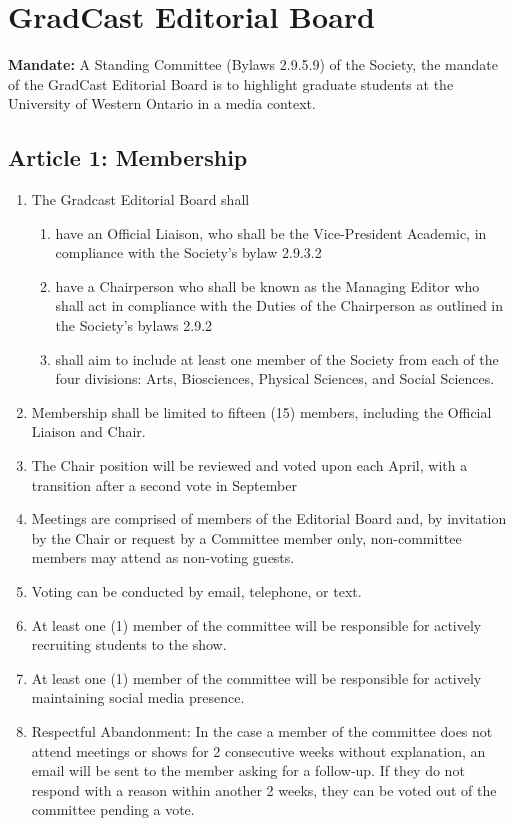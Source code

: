 \section{GradCast Editorial Board}

\textbf{Mandate:} A Standing Committee (Bylaws 2.9.5.9) of the Society, the mandate of the GradCast Editorial Board is to highlight graduate students at the University of Western Ontario in a media context.

\subsection{Article 1: Membership} 
\begin{enumerate} [label*=\arabic*., align=left]	
\item The Gradcast Editorial Board shall 

\begin{enumerate}[label*=\arabic*., align=left]	
\item have an Official Liaison, who shall be the Vice-President Academic, in compliance with the Society's bylaw 2.9.3.2 
\item have a Chairperson who shall be known as the Managing Editor who shall act in compliance with the Duties of the Chairperson as outlined in the Society's bylaws 2.9.2
\item  shall aim to include at least one member of the Society from each of the four divisions: Arts, Biosciences, Physical Sciences, and Social Sciences.
\end{enumerate}

\item Membership shall be limited to fifteen (15) members, including the Official Liaison and Chair.
\item The Chair position will be reviewed and voted upon each April, with a transition after a second vote in September
\item Meetings are comprised of members of the Editorial Board and, by invitation by the Chair or request by a Committee member only, non-committee members may attend as non-voting guests.
\item Voting can be conducted by email, telephone, or text.
\item At least one (1) member of the committee will be responsible for actively recruiting students to the show.
\item At least one (1) member of the committee will be responsible for actively maintaining social media presence. 
\item Respectful Abandonment: In the case a member of the committee does not attend meetings or shows for 2 consecutive weeks without explanation, an email will be sent to the member asking for a follow-up. If they do not respond with a reason within another 2 weeks, they can be voted out of the committee pending a vote.
\end{enumerate}


